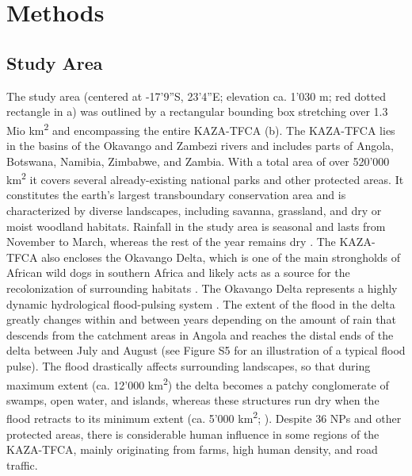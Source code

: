 \documentclass[abstract=on,10pt,a4paper,bibliography=totocnumbered]{article}
\begin{document}
\section{Methods}
\subsection{Study Area}
The study area (centered at -17'9''S, 23'4''E; elevation ca.
1'030 m; red dotted rectangle in a) was outlined by a
rectangular bounding box stretching over 1.3 Mio km\textsuperscript{2} and
encompassing the entire KAZA-TFCA (b). The KAZA-TFCA lies in the
basins of the Okavango and Zambezi rivers and includes parts of Angola,
Botswana, Namibia, Zimbabwe, and Zambia. With a total area of over 520'000
km\textsuperscript{2} it covers several already-existing national parks and
other protected areas. It constitutes the earth's largest transboundary
conservation area and is characterized by diverse landscapes, including savanna,
grassland, and dry or moist woodland habitats. Rainfall in the study area is
seasonal and lasts from November to March, whereas the rest of the year remains
dry \citep{Mendelsohn.2010}. The KAZA-TFCA also encloses the Okavango Delta,
which is one of the main strongholds of African wild dogs in southern Africa and
likely acts as a source for the recolonization of surrounding habitats
\citep{Woodroffe.2012, Cozzi.2013}. The Okavango Delta represents a highly
dynamic hydrological flood-pulsing system \citep{McNutt.1996, Wolski.2017}. The
extent of the flood in the delta greatly changes within and between years
depending on the amount of rain that descends from the catchment areas in Angola
and reaches the distal ends of the delta between July and August (see Figure S5
for an illustration of a typical flood pulse). The flood drastically affects
surrounding landscapes, so that during maximum extent (ca. 12'000
km\textsuperscript{2}) the delta becomes a patchy conglomerate of swamps, open
water, and islands, whereas these structures run dry when the flood retracts to
its minimum extent (ca. 5'000 km\textsuperscript{2}; \citealp{Gumbricht.2004,
Wolski.2017, McCarthy.1998}). Despite 36 NPs and other protected areas, there is
considerable human influence in some regions of the KAZA-TFCA, mainly
originating from farms, high human density, and road traffic.
\end{document}
